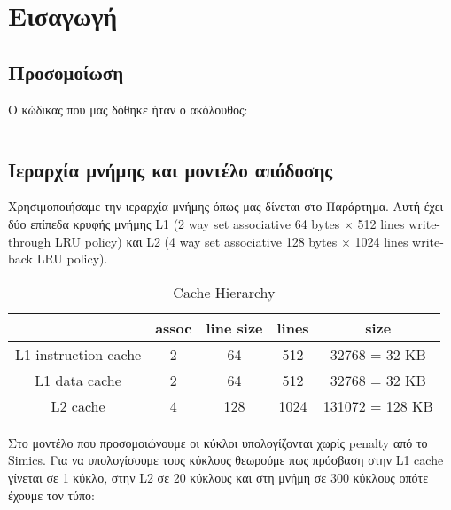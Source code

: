 \documentclass[a4paper,12pt]{article}
\begin{document}
\def\thesection {\arabic{section}. }
\def\thesubsection {\Roman{subsection}) }



\section*{Εισαγωγή}


\subsection{Προσομοίωση}
Ο κώδικας που μας δόθηκε ήταν ο ακόλουθος:

\inputminted[linenos,fontsize=\scriptsize,frame=leftline]{c}{files/partA1-default-partA.c}


\pagebreak


\subsection{Ιεραρχία μνήμης και μοντέλο απόδοσης}

Χρησιμοποιήσαμε την ιεραρχία μνήμης όπως μας δίνεται στο Παράρτημα. Αυτή έχει
δύο επίπεδα κρυφής μνήμης L1 (2 way set associative 64 bytes $\times$ 512 lines
write-through LRU policy) και
L2 (4 way set associative 128 bytes $\times$ 1024 lines write-back LRU policy).

\begin{table}[H]
    \centering
    \begin{tabular}{| c | c | c | c | c |}
        \hline
           & assoc  &   line size &   lines & size\\
        \hline
        \hline
        L1 instruction cache   & 2  &   64  &   512 & 32768 = 32 KB\\
        \hline
        L1 data cache   & 2  &   64  &   512 & 32768 = 32 KB\\
        \hline
        L2 cache  & 4  &   128  &   1024 & 131072 = 128 KB\\
        \hline
    \end{tabular}
    \caption{Cache Hierarchy}
    \label{fig:T2}
\end{table}

Στο μοντέλο που προσομοιώνουμε οι κύκλοι υπολογίζονται χωρίς penalty από το
Simics. Για να υπολογίσουμε τους κύκλους θεωρούμε πως πρόσβαση στην L1 cache
γίνεται σε 1 κύκλο, στην L2 σε 20 κύκλους και στη μνήμη σε 300 κύκλους οπότε
έχουμε τον τύπο:
\end{document}
